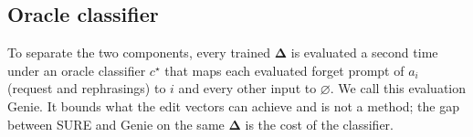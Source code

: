 \documentclass{article}
\theoremstyle{remark}
\newtheorem{remark}{Remark}
\theoremstyle{definition}
\begin{document}
\subsection{Oracle classifier}
\label{sec:oracle}
To separate the two components, every trained $\boldsymbol\Delta$ is evaluated a second time under an oracle classifier $c^\star$ that maps each evaluated forget prompt of $a_i$ (request and rephrasings) to $i$ and every other input to $\varnothing$. We call this evaluation Genie. It bounds what the edit vectors can achieve and is not a method; the gap between SURE and Genie on the same $\boldsymbol\Delta$ is the cost of the classifier.

\end{document}
